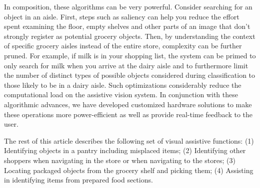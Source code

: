 In composition, these algorithms can be very powerful. Consider
searching for an object in an aisle. First, steps such as saliency can
help you reduce the effort spent examining the floor, empty shelves
and other parts of an image that don't strongly register as potential
grocery objects. Then, by understanding the context of specific
grocery aisles instead of the entire store, complexity can be further
pruned.  For example, if milk is in your shopping list, the system can
be primed to only search for milk when you arrive at the dairy aisle
and to furthermore limit the number of distinct types of possible
objects considered during classification to those likely to be in a
dairy aisle. Such optimizations considerably reduce the computational
load on the assistive vision system. In conjunction with these
algorithmic advances, we have developed customized hardware solutions
to make these operations more power-efficient as well as provide
real-time feedback to the user.



The rest of this article describes the following set of visual
assistive functions: (1) Identifying objects in a pantry including
misplaced items; (2) Identifying other shoppers when navigating in the
store or when navigating to the stores; (3) Locating packaged objects
from the grocery shelf and picking them; (4) Assisting in identifying
items from prepared food sections. 


